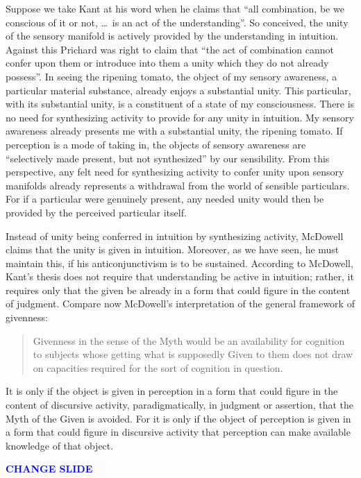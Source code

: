 \documentclass[12pt]{article}
\newcommand{\change}{\textcolor{blue}{\textbf{CHANGE SLIDE}}}
\begin{document}
Suppose we take Kant at his word when he claims that ``all combination, be we conscious of it or not, \ldots\ is an act of the understanding''. So conceived, the unity of the sensory manifold is actively provided by the understanding in intuition. Against this  Prichard was right to claim that ``the act of combination cannot confer upon them or introduce into them a unity which they do not already possess''. In seeing the ripening tomato, the object of my sensory awareness, a particular material substance, already enjoys a substantial unity. This particular, with its substantial unity, is a constituent of a state of my consciousness. There is no need for synthesizing activity to provide for any unity in intuition. My sensory awareness already presents me with a substantial unity, the ripening tomato. If perception is a mode of taking in, the objects of sensory awareness are ``selectively made present, but not synthesized'' by our sensibility. From this perspective, any felt need for synthesizing activity to confer unity upon sensory manifolds already represents a withdrawal from the world of sensible particulars. For if a particular were genuinely present, any needed unity would then be provided by the perceived particular itself.

Instead of unity being conferred in intuition by synthesizing activity, McDowell claims that the unity is given in intuition. Moreover, as we have seen, he must maintain this, if his anticonjunctivism is to be sustained. According to McDowell, Kant's thesis does not require that understanding be active in intuition; rather, it requires only that the given be already in a form that could figure in the content of judgment. Compare now McDowell's interpretation of the general framework of givenness:
\begin{quote}
	Givenness in the sense of the Myth would be an availability for cognition to subjects whose getting what is supposedly Given to them does not draw on capacities required for the sort of cognition in question. 
\end{quote}
It is only if the object is given in perception in a form that could figure in the content of discursive activity, paradigmatically, in judgment or assertion, that the Myth of the Given is avoided. For it is only if the object of perception is given in a form that could figure in discursive activity that perception can make available knowledge of that object. 

\change
\end{document}
